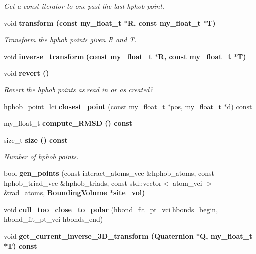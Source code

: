 \begin{CompactItemize}
\begin{CompactList}\small\item\em Get a const iterator to one past the last hphob point. \item\end{CompactList}\item 
void \bf{transform} (const my\_\-float\_\-t $\ast$R, const my\_\-float\_\-t $\ast$T)\label{classASCbase_1_1HphobPoints_1dbaaf75ee974e4153e58d4ad0d4abd3}

\begin{CompactList}\small\item\em Transform the hphob points given R and T. \item\end{CompactList}\item 
void \bf{inverse\_\-transform} (const my\_\-float\_\-t $\ast$R, const my\_\-float\_\-t $\ast$T)
\item 
void \bf{revert} ()\label{classASCbase_1_1HphobPoints_65c9e7ac92b005e6c0fc1e9995b94351}

\begin{CompactList}\small\item\em Revert the hphob points as read in or as created? \item\end{CompactList}\item 
hphob\_\-point\_\-lci \textbf{closest\_\-point} (const my\_\-float\_\-t $\ast$pos, my\_\-float\_\-t $\ast$d) const \label{classASCbase_1_1HphobPoints_3ccf4d89489adac1124e765a9493b604}

\item 
my\_\-float\_\-t \bf{compute\_\-RMSD} () const 
\item 
size\_\-t \bf{size} () const 
\begin{CompactList}\small\item\em Number of hphob points. \item\end{CompactList}\item 
bool \textbf{gen\_\-points} (const interact\_\-atoms\_\-vec \&hphob\_\-atoms, const hphob\_\-triad\_\-vec \&hphob\_\-triads, const std::vector$<$ atom\_\-vci $>$ \&rad\_\-atoms, \bf{Bounding\-Volume} $\ast$site\_\-vol)\label{classASCbase_1_1HphobPoints_09a7d1b1f0b101a6adbfa39e8cac7c6e}

\item 
void \textbf{cull\_\-too\_\-close\_\-to\_\-polar} (hbond\_\-fit\_\-pt\_\-vci hbonds\_\-begin, hbond\_\-fit\_\-pt\_\-vci hbonds\_\-end)\label{classASCbase_1_1HphobPoints_6ab0f4ed3f5b7ae8b84288b71ebc8311}

\item 
void \bf{get\_\-current\_\-inverse\_\-3D\_\-transform} (Quaternion $\ast$Q, my\_\-float\_\-t $\ast$T) const 
\end{CompactItemize}
